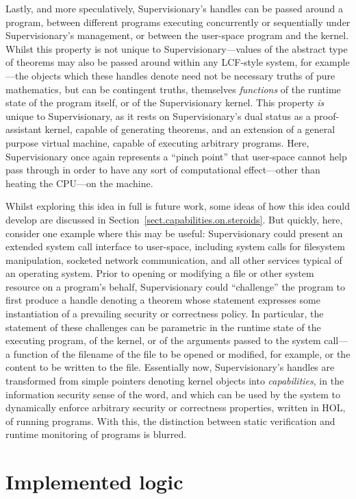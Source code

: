 \documentclass[a4paper, UKenglish, cleveref, autoref, thm-restate, colorlinks]{lipics-v2021}
\begin{document}
Lastly, and more speculatively, Supervisionary's handles can be passed around a program, between different programs executing concurrently or sequentially under Supervisionary's management, or between the user-space program and the kernel.
Whilst this property is not unique to Supervisionary---values of the abstract type of theorems may also be passed around within any LCF-style system, for example---the objects which these handles denote need not be necessary truths of pure mathematics, but can be contingent truths, themselves \emph{functions} of the runtime state of the program itself, or of the Supervisionary kernel.
This property \emph{is} unique to Supervisionary, as it rests on Supervisionary's dual status as a proof-assistant kernel, capable of generating theorems, and an extension of a general purpose virtual machine, capable of executing arbitrary programs.
Here, Supervisionary once again represents a ``pinch point'' that user-space cannot help pass through in order to have any sort of computational effect---other than heating the CPU---on the machine.

Whilst exploring this idea in full is future work, some ideas of how this idea could develop are discussed in Section~\ref{sect.capabilities.on.steroids}.
But quickly, here, consider one example where this may be useful: Supervisionary could present an extended system call interface to user-space, including system calls for filesystem manipulation, socketed network communication, and all other services typical of an operating system.
Prior to opening or modifying a file or other system resource on a program's behalf, Supervisionary could ``challenge'' the program to first produce a handle denoting a theorem whose statement expresses some instantiation of a prevailing security or correctness policy.
In particular, the statement of these challenges can be parametric in the runtime state of the executing program, of the kernel, or of the arguments passed to the system call---a function of the filename of the file to be opened or modified, for example, or the content to be written to the file.
Essentially now, Supervisionary's handles are transformed from simple pointers denoting kernel objects into \emph{capabilities}, in the information security sense of the word, and which can be used by the system to dynamically enforce arbitrary security or correctness properties, written in HOL, of running programs.
With this, the distinction between static verification and runtime monitoring of programs is blurred.

\section{Implemented logic}
\label{sect.implemented.logic}
\end{document}
